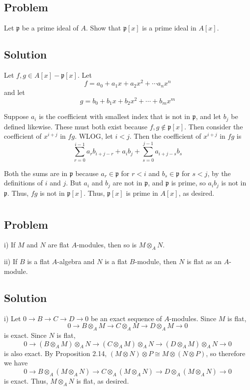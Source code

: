 \documentclass[book,12pt,oneside,openany]{memoir}
\begin{document}
\section{}
\subsection{Problem}
Let $\mathfrak{p}$ be a prime ideal of $A$. Show that $\mathfrak{p}[x]$ is a prime ideal in $A[x]$.

\subsection{Solution}
Let $f,g \in A[x] - \mathfrak{p}[x]$. Let \[f = a_0 + a_1x + a_2x^2 + \cdots a_n x^n\] and let \[g = b_0 + b_1 x + b_2 x^2 + \cdots + b_m x^m\]

Suppose $a_i$ is the coefficient with smallest index that is not in $\mathfrak{p}$, and let $b_j$ be defined likewise. These must both exist because $f,g \notin \mathfrak{p}[x]$. Then consider the coefficient of $x^{i+j}$ in $fg$. WLOG, let $i < j$. Then the coefficient of $x^{i+j}$ in $fg$ is \[\sum_{r = 0}^{i-1} a_r b_{i+j-r} + a_i b_j + \sum_{s = 0}^{j-1} a_{i+j-s}b_s\]

Both the sums are in $\mathfrak{p}$ because $a_r \in \mathfrak{p}$ for $r < i$ and $b_s \in \mathfrak{p}$ for $s < j$, by the definitions of $i$ and $j$. But $a_i$ and $b_j$ are not in $\mathfrak{p}$, and $\mathfrak{p}$ is prime, so $a_i b_j$ is not in $\mathfrak{p}$. Thus, $fg$ is not in $\mathfrak{p}[x]$. Thus, $\mathfrak{p}[x]$ is prime in $A[x]$, as desired.

\section{}
\subsection{Problem}

i) If $M$ and $N$ are flat $A$-modules, then so is $M \otimes_{A} N $.

ii) If $B$ is a flat $A$-algebra and $N$ is a flat $B$-module, then $N$ is flat as an $A$-module.

\subsection{Solution}

i) Let $0 \rightarrow B \rightarrow C \rightarrow D \rightarrow 0$ be an exact sequence of $A$-modules. Since $M$ is flat, \[0 \rightarrow B \otimes_A M \rightarrow C \otimes_A M \rightarrow D \otimes_A M \rightarrow 0\] is exact. Since $N$ is flat, 
\[0 \rightarrow (B \otimes_A M) \otimes_A N \rightarrow (C \otimes_A M) \otimes_A N \rightarrow (D \otimes_A M) \otimes_A N \rightarrow 0\] is also exact. By Proposition 2.14, $(M \otimes N) \otimes P \cong M \otimes (N \otimes P)$, so therefore we have 
\[0 \rightarrow B \otimes_A (M \otimes_A N) \rightarrow C \otimes_A (M \otimes_A N) \rightarrow D \otimes_A (M \otimes_A N) \rightarrow 0\] is exact. Thus, $M \otimes_A N$ is flat, as desired.
\end{document}
